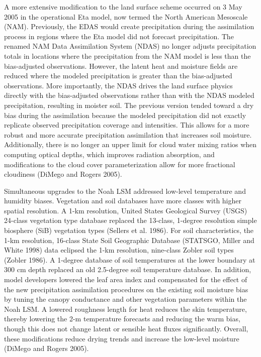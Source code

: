 \documentclass[twocolumn]{article}
\begin{document}
A more extensive modification to the land surface scheme occurred on 3 May 2005 in the operational Eta model, now termed the North American Mesoscale (NAM).  Previously, the EDAS would create precipitation during the assimilation process in regions where the Eta model did not forecast precipitation.  The renamed NAM Data Assimilation System (NDAS) no longer adjusts precipitation totals in locations where the precipitation from the NAM model is less than the bias-adjusted observations.  However, the latent heat and moisture fields are reduced where the modeled precipitation is greater than the bias-adjusted observations.  More importantly, the NDAS drives the land surface physics directly with the bias-adjusted observations rather than with the NDAS modeled precipitation, resulting in moister soil.  The previous version tended toward a dry bias during the assimilation because the modeled precipitation did not exactly replicate observed precipitation coverage and intensities.  This allows for a more robust and more accurate precipitation assimilation that increases soil moisture.  Additionally, there is no longer an upper limit for cloud water mixing ratios when computing optical depths, which improves radiation absorption, and modifications to the cloud cover parameterization allow for more fractional cloudiness (DiMego and Rogers 2005).

Simultaneous upgrades to the Noah LSM addressed low-level temperature and humidity biases.  Vegetation and soil databases have more classes with higher spatial resolution.  A 1-km resolution, United States Geological Survey (USGS) 24-class vegetation type database replaced the 13-class, 1-degree resolution simple biosphere (SiB) vegetation types (Sellers et al. 1986).  For soil characteristics, the 1-km resolution, 16-class State Soil Geographic Database (STATSGO, Miller and White 1998) data eclipsed the 1-km resolution, nine-class Zobler soil types (Zobler 1986).  A 1-degree database of soil temperatures at the lower boundary at 300 cm depth replaced an old 2.5-degree soil temperature database.  In addition, model developers lowered the leaf area index and compensated for the effect of the new precipitation assimilation procedures on the existing soil moisture bias by tuning the canopy conductance and other vegetation parameters within the Noah LSM.  A lowered roughness length for heat reduces the skin temperature, thereby lowering the 2-m temperature forecasts and reducing the warm bias, though this does not change latent or sensible heat fluxes significantly.  Overall, these modifications reduce drying trends and increase the low-level moisture (DiMego and Rogers 2005).
\end{document}
